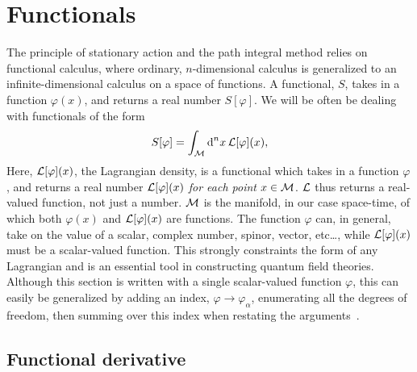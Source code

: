 \section{Functionals}
\label{appendix: Functional derivatives}


The principle of stationary action and the path integral method relies on functional calculus, where ordinary, $n$-dimensional calculus is generalized to an infinite-dimensional calculus on a space of functions.
A functional, $S$, takes in a function $\varphi(x)$, and returns a real number $S[\varphi]$.
We will be often be dealing with functionals of the form
%
\begin{equation}
    \label{general action functional}
    S[\varphi] = \int_{\mathcal{M}} \text{d}^n x \, \mathcal{L}[\varphi](x),
\end{equation}
%
Here, $\mathcal{L}[\varphi](x)$, the Lagrangian density, is a functional which takes in a function $\varphi$, and returns a real number $\mathcal{L}[\varphi](x)$ \emph{for each point} $x \in \mathcal{M}$.
$\mathcal{L}$ thus returns a real-valued function, not just a number.
$\mathcal{M}$ is the manifold, in our case space-time, of which both $\varphi(x)$ and $\mathcal{L}[\varphi](x)$ are functions.
The function $\varphi$ can, in general, take on the value of a scalar, complex number, spinor, vector, etc\dots, while $\mathcal{L}[\varphi](x)$ must be a scalar-valued function.
This strongly constraints the form of any Lagrangian and is an essential tool in constructing quantum field theories.
Although this section is written with a single scalar-valued function $\varphi$, this can easily be generalized by adding an index, $\varphi \rightarrow \varphi_\alpha$, enumerating all the degrees of freedom, then summing over this index when restating the arguments~\autocite{carrollSpacetimeGeometryIntroduction2019,schwartzQuantumFieldTheory2013,peskinIntroductionQuantumField1995}.



\subsection{Functional derivative}

